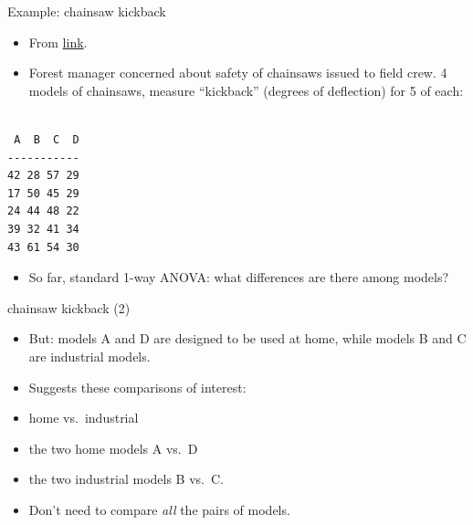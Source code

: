 \documentclass[
  ignorenonframetext,
]{beamer}
\providecommand{\tightlist}{%
  \setlength{\itemsep}{0pt}\setlength{\parskip}{0pt}}
\begin{document}
\begin{frame}[fragile]{Example: chainsaw kickback}
\protect\hypertarget{example-chainsaw-kickback}{}

\begin{itemize}
\item
  From
  \href{http://www.ohio.edu/plantbio/staff/mccarthy/quantmet/lectures/ANOVA2.pdf}{link}.
\item
  Forest manager concerned about safety of chainsaws issued to field
  crew. 4 models of chainsaws, measure ``kickback'' (degrees of
  deflection) for 5 of each:
\end{itemize}

\begin{verbatim}

 A  B  C  D
-----------
42 28 57 29
17 50 45 29
24 44 48 22
39 32 41 34
43 61 54 30
\end{verbatim}

\begin{itemize}
\tightlist
\item
  So far, standard 1-way ANOVA: what differences are there among models?
\end{itemize}

\end{frame}

\begin{frame}{chainsaw kickback (2)}
\protect\hypertarget{chainsaw-kickback-2}{}

\begin{itemize}
\item
  But: models A and D are designed to be used at home, while models B
  and C are industrial models.
\item
  Suggests these comparisons of interest:
\item
  home vs.~industrial
\item
  the two home models A vs.~D
\item
  the two industrial models B vs.~C.
\item
  Don't need to compare \emph{all} the pairs of models.
\end{itemize}

\end{frame}
\end{document}
